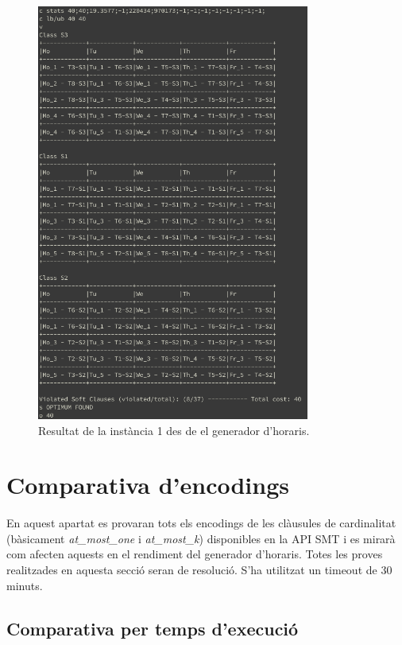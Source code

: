 \documentclass[11pt,a4paper,twoside]{report}
\begin{document}
  \begin{figure}[htp!]
    \centering
    \includegraphics[width=0.8\textwidth]{Diagrames/brazil1_terminal.png}
    \caption{Resultat de la instància 1 des de el generador d'horaris.}
    \label{fig:bi1_term}
  \end{figure}
  \newpage

  \section{Comparativa d'encodings}

  En aquest apartat es provaran tots els encodings de les clàusules de cardinalitat (bàsicament \textit{at\_most\_one} i \textit{at\_most\_k}) disponibles en la API SMT i es mirarà com afecten aquests en el rendiment del generador d'horaris. 
  Totes les proves realitzades en aquesta secció seran de resolució. S'ha utilitzat un timeout de 30 minuts.

  \subsection{Comparativa per temps d'execució}
\end{document}
